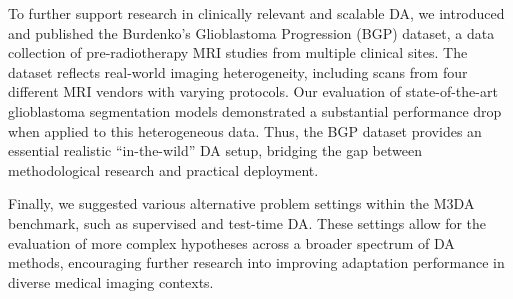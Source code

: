 To further support research in clinically relevant and scalable DA, we introduced and published the Burdenko's Glioblastoma Progression (BGP) dataset, a data collection of pre-radiotherapy MRI studies from multiple clinical sites. The dataset reflects real-world imaging heterogeneity, including scans from four different MRI vendors with varying protocols. Our evaluation of state-of-the-art glioblastoma segmentation models demonstrated a substantial performance drop when applied to this heterogeneous data. Thus, the BGP dataset provides an essential realistic ``in-the-wild'' DA setup, bridging the gap between methodological research and practical deployment.


Finally, we suggested various alternative problem settings within the M3DA benchmark, such as supervised and test-time DA. These settings allow for the evaluation of more complex hypotheses across a broader spectrum of DA methods, encouraging further research into improving adaptation performance in diverse medical imaging contexts.






